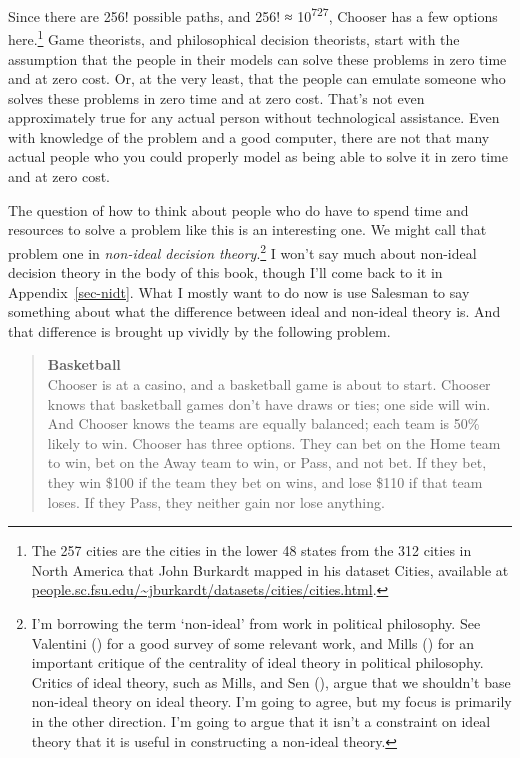 \documentclass[
  12pt,
  letterpaper,
  DIV=11,
  numbers=noendperiod]{scrreprt}
\begin{document}
Since there are 256! possible paths, and 256! ≈ 10\textsuperscript{727},
Chooser has a few options here.\footnote{The 257 cities are the cities
  in the lower 48 states from the 312 cities in North America that John
  Burkardt mapped in his dataset Cities, available at
  \href{https://people.sc.fsu.edu/~jburkardt/datasets/cities/cities.html}{people.sc.fsu.edu/\textasciitilde jburkardt/datasets/cities/cities.html}.}
Game theorists, and philosophical decision theorists, start with the
assumption that the people in their models can solve these problems in
zero time and at zero cost. Or, at the very least, that the people can
emulate someone who solves these problems in zero time and at zero cost.
That's not even approximately true for any actual person without
technological assistance. Even with knowledge of the problem and a good
computer, there are not that many actual people who you could properly
model as being able to solve it in zero time and at zero cost.

The question of how to think about people who do have to spend time and
resources to solve a problem like this is an interesting one. We might
call that problem one in \emph{non-ideal decision theory}.\footnote{I'm
  borrowing the term `non-ideal' from work in political philosophy. See
  Valentini () for a good survey of
  some relevant work, and Mills () for an
  important critique of the centrality of ideal theory in political
  philosophy. Critics of ideal theory, such as Mills, and Sen
  (), argue that we shouldn't base non-ideal
  theory on ideal theory. I'm going to agree, but my focus is primarily
  in the other direction. I'm going to argue that it isn't a constraint
  on ideal theory that it is useful in constructing a non-ideal theory.}
I won't say much about non-ideal decision theory in the body of this
book, though I'll come back to it in Appendix~\ref{sec-nidt}. What I
mostly want to do now is use Salesman to say something about what the
difference between ideal and non-ideal theory is. And that difference is
brought up vividly by the following problem.

\begin{quote}
\textbf{Basketball}\\
Chooser is at a casino, and a basketball game is about to start. Chooser
knows that basketball games don't have draws or ties; one side will win.
And Chooser knows the teams are equally balanced; each team is 50\%
likely to win. Chooser has three options. They can bet on the Home team
to win, bet on the Away team to win, or Pass, and not bet. If they bet,
they win \$100 if the team they bet on wins, and lose \$110 if that team
loses. If they Pass, they neither gain nor lose anything.
\end{quote}
\end{document}
